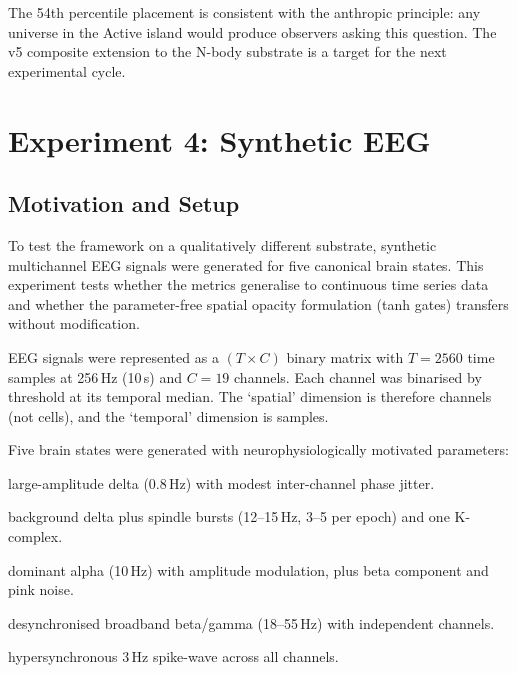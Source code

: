 \documentclass[12pt,a4paper]{article}
\begin{document}
The 54th percentile placement is consistent with the anthropic
principle: any universe in the Active island would produce observers
asking this question.
The v5 composite extension to the N-body substrate is a target for
the next experimental cycle.

\section{Experiment 4: Synthetic EEG}

\subsection{Motivation and Setup}

To test the framework on a qualitatively different substrate,
synthetic multichannel EEG signals were generated for five canonical
brain states.
This experiment tests whether the metrics generalise to continuous
time series data and whether the parameter-free spatial opacity
formulation (tanh gates) transfers without modification.

EEG signals were represented as a $(T\times C)$ binary matrix with
$T=2560$ time samples at 256\,Hz (10\,s) and $C=19$ channels.
Each channel was binarised by threshold at its temporal median.
The `spatial' dimension is therefore channels (not cells), and the
`temporal' dimension is samples.

Five brain states were generated with neurophysiologically motivated
parameters:

\begin{description}[noitemsep]
  \item[Deep sleep:] large-amplitude delta (0.8\,Hz) with modest
    inter-channel phase jitter.
  \item[NREM Stage~2 (sleep spindles):] background delta plus spindle
    bursts (12--15\,Hz, 3--5 per epoch) and one K-complex.
  \item[Awake, eyes-closed resting:] dominant alpha (10\,Hz) with
    amplitude modulation, plus beta component and pink noise.
  \item[Active cognitive task:] desynchronised broadband beta/gamma
    (18--55\,Hz) with independent channels.
  \item[Seizure (tonic-clonic):] hypersynchronous 3\,Hz spike-wave
    across all channels.
\end{description}
\end{document}
